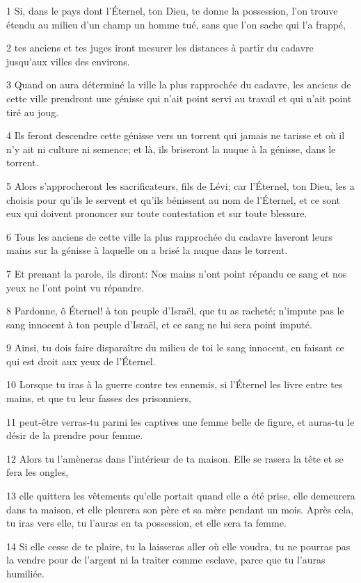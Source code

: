\par 1 Si, dans le pays dont l'Éternel, ton Dieu, te donne la possession, l'on trouve étendu au milieu d'un champ un homme tué, sans que l'on sache qui l'a frappé,
\par 2 tes anciens et tes juges iront mesurer les distances à partir du cadavre jusqu'aux villes des environs.
\par 3 Quand on aura déterminé la ville la plus rapprochée du cadavre, les anciens de cette ville prendront une génisse qui n'ait point servi au travail et qui n'ait point tiré au joug.
\par 4 Ils feront descendre cette génisse vers un torrent qui jamais ne tarisse et où il n'y ait ni culture ni semence; et là, ils briseront la nuque à la génisse, dans le torrent.
\par 5 Alors s'approcheront les sacrificateurs, fils de Lévi; car l'Éternel, ton Dieu, les a choisis pour qu'ils le servent et qu'ils bénissent au nom de l'Éternel, et ce sont eux qui doivent prononcer sur toute contestation et sur toute blessure.
\par 6 Tous les anciens de cette ville la plus rapprochée du cadavre laveront leurs mains sur la génisse à laquelle on a brisé la nuque dans le torrent.
\par 7 Et prenant la parole, ils diront: Nos mains n'ont point répandu ce sang et nos yeux ne l'ont point vu répandre.
\par 8 Pardonne, ô Éternel! à ton peuple d'Israël, que tu as racheté; n'impute pas le sang innocent à ton peuple d'Israël, et ce sang ne lui sera point imputé.
\par 9 Ainsi, tu dois faire disparaître du milieu de toi le sang innocent, en faisant ce qui est droit aux yeux de l'Éternel.
\par 10 Lorsque tu iras à la guerre contre tes ennemis, si l'Éternel les livre entre tes mains, et que tu leur fasses des prisonniers,
\par 11 peut-être verras-tu parmi les captives une femme belle de figure, et auras-tu le désir de la prendre pour femme.
\par 12 Alors tu l'amèneras dans l'intérieur de ta maison. Elle se rasera la tête et se fera les ongles,
\par 13 elle quittera les vêtements qu'elle portait quand elle a été prise, elle demeurera dans ta maison, et elle pleurera son père et sa mère pendant un mois. Après cela, tu iras vers elle, tu l'auras en ta possession, et elle sera ta femme.
\par 14 Si elle cesse de te plaire, tu la laisseras aller où elle voudra, tu ne pourras pas la vendre pour de l'argent ni la traiter comme esclave, parce que tu l'auras humiliée.
